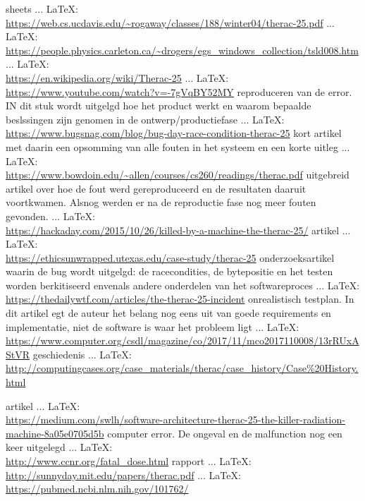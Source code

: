 \begin{thebibliography}{99}
{{{{				
				sheets
				 ... \LaTeX:\\ \url{https://web.cs.ucdavis.edu/~rogaway/classes/188/winter04/therac-25.pdf}
				 ... \LaTeX:\\ \url{https://people.physics.carleton.ca/~drogers/egs_windows_collection/tsld008.htm}
				\cite{}
				 ... \LaTeX:\\ \url{https://en.wikipedia.org/wiki/Therac-25}
				 ... \LaTeX:\\ \url{https://www.youtube.com/watch?v=-7gVqBY52MY}
				\cite{}
				reproduceren van de error. IN dit stuk wordt uitgelgd hoe het product werkt en waarom bepaalde beslssingen zijn genomen in de ontwerp/productiefase
				 ... \LaTeX:\\ \url{https://www.bugsnag.com/blog/bug-day-race-condition-therac-25}
				kort artikel met daarin een opsomming van alle fouten in het systeem en een korte uitleg
				 ... \LaTeX:\\ \url{https://www.bowdoin.edu/~allen/courses/cs260/readings/therac.pdf}
				uitgebreid artikel over hoe de fout werd gereproduceerd en de resultaten daaruit voortkwamen. Alsnog werden er na de reproductie fase nog meer fouten gevonden.
				 ... \LaTeX:\\ \url{https://hackaday.com/2015/10/26/killed-by-a-machine-the-therac-25/}
				artikel
				 ... \LaTeX:\\ \url{https://ethicsunwrapped.utexas.edu/case-study/therac-25}
				onderzoeksartikel waarin de bug wordt uitgelgd: de racecondities, de bytepositie en het testen worden berkitiseerd envenals andere onderdelen van het softwareproces
				 ... \LaTeX:\\ \url{https://thedailywtf.com/articles/the-therac-25-incident}
				\cite{}
				onrealistisch testplan. In dit artikel egt de auteur het belang nog eens uit van goede requirements en implementatie, niet de software is waar het probleem ligt
				 ... \LaTeX:\\ \url{https://www.computer.org/csdl/magazine/co/2017/11/mco2017110008/13rRUxAStVR}
				\cite{}
				geschiedenis
				 ... \LaTeX:\\ \url{http://computingcases.org/case_materials/therac/case_history/Case%20History.html}
				
				artikel
				 ... \LaTeX:\\ \url{https://medium.com/swlh/software-architecture-therac-25-the-killer-radiation-machine-8a05e0705d5b}
				computer error. De ongeval en de malfunction nog een keer uitgelegd
				 ... \LaTeX:\\ \url{http://www.ccnr.org/fatal_dose.html}
				rapport
				 ... \LaTeX:\\ \url{http://sunnyday.mit.edu/papers/therac.pdf}
				 ... \LaTeX:\\ \url{https://pubmed.ncbi.nlm.nih.gov/101762/}
				
}}}}
\end{thebibliography}
